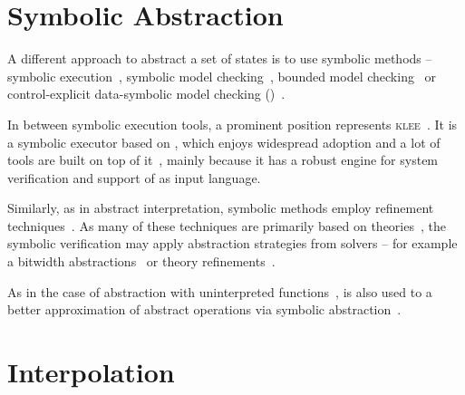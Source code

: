 \section{Symbolic Abstraction}

A different approach to abstract a set of states is to use symbolic methods --
symbolic execution~\cite{King76, Cadar2013symbolic, Baldoni2018survey}, symbolic model
checking~\cite{Clarke96, McMillan93, Cimatti20}, bounded model
checking~\cite{Biere2003bounded} or control-explicit data-symbolic model
checking (\ceds)~\cite{Mrazek2016}.

In between symbolic execution tools, a prominent position represents
\textsc{klee}~\cite{Cadar2008klee}. It is a symbolic executor based on \llvm,
which enjoys widespread adoption and a lot of tools are built on top of
it~\cite{Beyer2018Klee, Chalupa2018, Chen2018, Menezes2018}, mainly because it
has a robust engine for system verification and support of \llvm as input
language.

Similarly, as in abstract interpretation, symbolic methods employ refinement
techniques~\cite{Beyer2016}. As many of these techniques are primarily based on
\smt theories~\cite{Beyer2018}, the symbolic verification may apply abstraction
strategies from solvers -- for example a bitwidth
abstractions~\cite{Jonavs2018} or theory refinements~\cite{Hyvarinen2017}.

As in the case of abstraction with uninterpreted functions~\cite{Gange2016}, \smt is also used to
a better approximation of abstract operations via symbolic abstraction~\cite{Thakur2012}.


\section{Interpolation}
\label{sec:interpolation}





